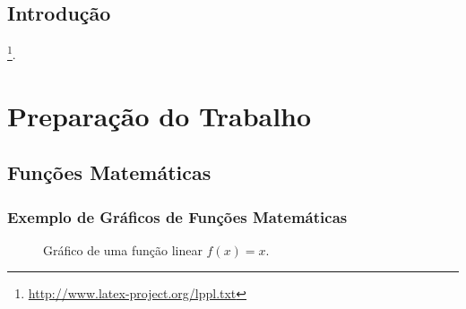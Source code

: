\documentclass[
	12pt,				%
    oneside,            %
	a4paper,			%
	english,			%
	brazilian,		    %
	]{AcademicoUFT}
\begin{document}
\tableofcontents*
\cleardoublepage


\textual


\chapter{Introdução}

\lipsum[1] %
\footnote{\url{http://www.latex-project.org/lppl.txt}}.


\part{Preparação do Trabalho}


\chapter{Funções Matemáticas}

\section{Exemplo de Gráficos de Funções Matemáticas}

\lipsum[1] %
\cite{talbot2012}


\begin{figure}[H]
    \centering
    \caption{Gráfico de uma função linear $f(x)=x$.}
    \label{fig:funcao_linear}
\end{figure}
\end{document}
